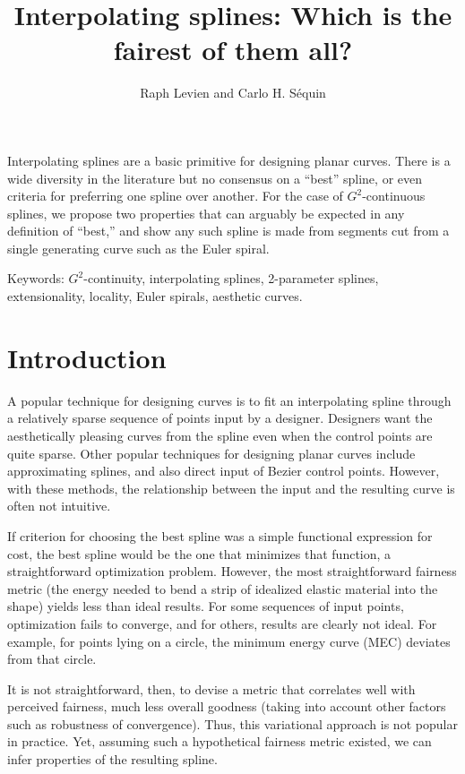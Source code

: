 \documentclass{article}
\begin{document}
\author{Raph Levien and Carlo H. S\'equin}
\title{Interpolating splines: Which is the fairest of them all?}

\maketitle

\abstract

Interpolating splines are a basic primitive for designing planar
curves. There is a wide diversity in the literature but no consensus
on a ``best'' spline, or even criteria for preferring one spline over
another. For the case of $G^2$-continuous splines, we propose two
properties that can arguably be expected in any definition of
``best,'' and show any such spline is made from segments cut from a
single generating curve such as the Euler spiral.

Keywords: $G^2$-continuity, interpolating splines, 2-parameter
splines, extensionality, locality, Euler spirals, aesthetic curves.

\section{Introduction}

A popular technique for designing curves is to fit an interpolating
spline through a relatively sparse sequence of points input by a
designer. Designers want the aesthetically pleasing curves from the
spline even when the control points are quite sparse.
Other popular techniques for designing planar curves include
approximating splines, and also direct input of Bezier control
points. However, with these methods, the relationship between the
input and the resulting curve is often not intuitive.

If criterion for choosing the best spline was a simple functional
expression for cost, the best spline would be the one that minimizes
that function, a straightforward optimization problem. However, the
most straightforward fairness metric (the energy needed to bend a
strip of idealized elastic material into the shape) yields less than
ideal results. For some sequences of input points, optimization fails
to converge, and for others, results are clearly not ideal. For
example, for points lying on a circle, the minimum energy curve (MEC)
deviates from that circle.

It is not straightforward, then, to devise a metric that correlates
well with perceived fairness, much less overall goodness (taking into
account other factors such as robustness of convergence). Thus, this
variational approach is not popular in practice. Yet, assuming such a
hypothetical fairness metric existed, we can infer properties of the
resulting spline.
\end{document}
